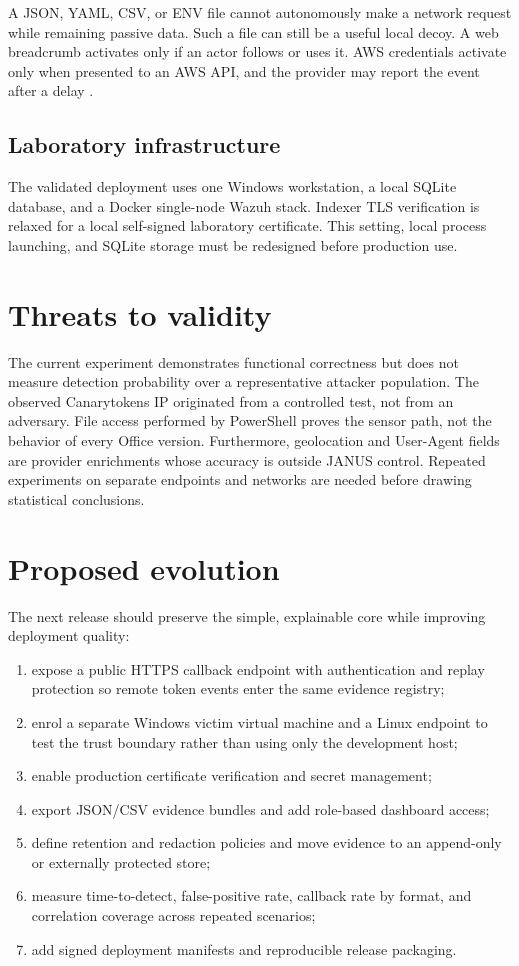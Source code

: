 A JSON, YAML, CSV, or ENV file cannot autonomously make a network request while
remaining passive data. Such a file can still be a useful local decoy. A web
breadcrumb activates only if an actor follows or uses it. AWS credentials
activate only when presented to an AWS API, and the provider may report the
event after a delay \cite{canaryAws}.

\subsection{Laboratory infrastructure}

The validated deployment uses one Windows workstation, a local SQLite database,
and a Docker single-node Wazuh stack. Indexer TLS verification is relaxed for a
local self-signed laboratory certificate. This setting, local process launching,
and SQLite storage must be redesigned before production use.

\section{Threats to validity}

The current experiment demonstrates functional correctness but does not measure
detection probability over a representative attacker population. The observed
Canarytokens IP originated from a controlled test, not from an adversary. File
access performed by PowerShell proves the sensor path, not the behavior of every
Office version. Furthermore, geolocation and User-Agent fields are provider
enrichments whose accuracy is outside JANUS control. Repeated experiments on
separate endpoints and networks are needed before drawing statistical
conclusions.

\section{Proposed evolution}

The next release should preserve the simple, explainable core while improving
deployment quality:

\begin{enumerate}[label=\arabic*.]
  \item expose a public HTTPS callback endpoint with authentication and replay
  protection so remote token events enter the same evidence registry;
  \item enrol a separate Windows victim virtual machine and a Linux endpoint to
  test the trust boundary rather than using only the development host;
  \item enable production certificate verification and secret management;
  \item export JSON/CSV evidence bundles and add role-based dashboard access;
  \item define retention and redaction policies and move evidence to an
  append-only or externally protected store;
  \item measure time-to-detect, false-positive rate, callback rate by format,
  and correlation coverage across repeated scenarios;
  \item add signed deployment manifests and reproducible release packaging.
\end{enumerate}

